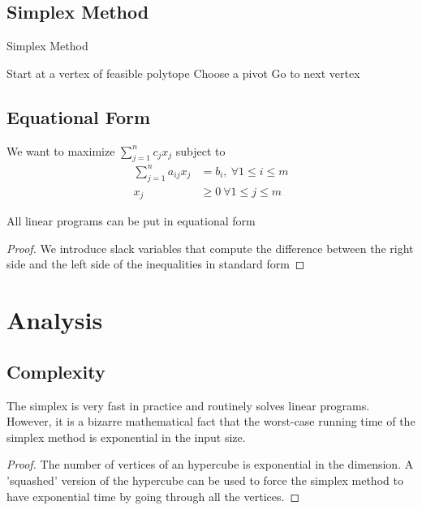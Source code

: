 \documentclass[12pt]{cours}
\begin{document}
\subsection{Simplex Method}
\begin{algorithm}
    \caption{Simplex Method}
    \begin{algorithmic}
        \State Start at a vertex of feasible polytope
            \State Choose a pivot
            \State Go to next vertex
        \EndWhile
    \end{algorithmic}
\end{algorithm}

\subsection{Equational Form}
\begin{definition}
    We want to maximize $\sum_{j = 1}^{n} c_{j}x_{j}$ subject to
    \[
        \begin{aligned}
            \sum_{j = 1}^{n}a_{ij}x_{j} &= b_{i}, \ \forall 1 \leq i \leq m\\
            x_{j} &\geq 0 \ \forall 1 \leq j \leq m
        \end{aligned}
    \]
\end{definition}
\begin{proposition}
    All linear programs can be put in equational form
\end{proposition}
\begin{proof}
    We introduce slack variables that compute the difference between the right side and the left side of the inequalities in standard form
\end{proof}

\section{Analysis}
\subsection{Complexity}
\begin{proposition}
    The simplex is very fast in practice and routinely solves linear programs. However, it is a bizarre mathematical fact that the worst-case running time of the simplex method is exponential in the input size. \\
\end{proposition}
\begin{proof}
    The number of vertices of an hypercube is exponential in the dimension. A 'squashed' version of the hypercube can be used to force the simplex method to have exponential time by going through all the vertices.
\end{proof}
\end{document}
